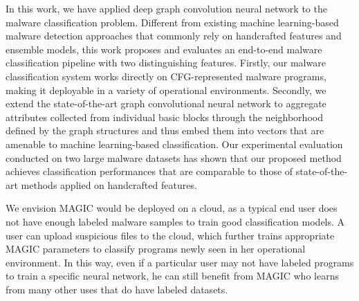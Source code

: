 \label{MG:Sec:Conclusion}

In this work, we have applied deep graph convolution neural network to the malware classification problem.
Different from existing machine learning-based malware detection approaches that commonly rely on handcrafted features and ensemble models,
this work proposes and evaluates an end-to-end malware classification pipeline with two distinguishing features.
Firstly, our malware classification system works directly on CFG-represented malware programs, making it deployable in a variety of operational environments.
Secondly, we extend the state-of-the-art graph convolutional neural network to aggregate attributes collected from individual basic blocks through the neighborhood defined by the graph structures and thus embed them into vectors that are amenable to machine learning-based classification.
Our experimental evaluation conducted on two large malware datasets has shown that our proposed method achieves classification performances that are comparable to those of state-of-the-art methods applied on handcrafted features.

We envision MAGIC would be deployed on a cloud, as a typical end user does not have enough labeled malware samples to train good classification models.
A user can upload suspicious files to the cloud, which further trains appropriate MAGIC parameters to classify programs newly seen in her operational environment.
In this way, even if a particular user may not have labeled programs to train a specific neural network, he can still benefit from MAGIC who learns from many other uses that do have labeled datasets.



